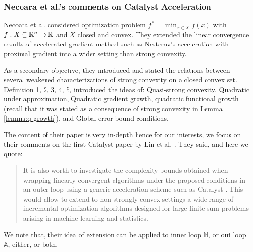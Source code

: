 \documentclass[12pt]{article}
\begin{document}
        \subsubsection{Necoara et al.'s comments on Catalyst Acceleration}
            Necoara et al. \cite{necoara_linear_2019} considered optimization problem $f^* = \min_{x \in X} f(x)$ with $f: X \subseteq \mathbb R^n \rightarrow \mathbb R$ and $X$ closed and convex. 
            They extended the linear convergence results of accelerated gradient method such as Nesterov's acceleration with proximal gradient into a wider setting than strong convexity. 
            \par
            As a secondary objective, they introduced and stated the relations between several weakened characterizations of strong convexity on a closed convex set. 
            Definition 1, 2, 3, 4, 5, introduced the ideas of: Quasi-strong convexity, Quadratic under approximation, Quadratic gradient growth, quadratic functional growth (recall that it was stated as a consequence of strong convexity in Lemma \ref{lemma:q-growth}), and Global error bound conditions. 
            \par
            The content of their paper is very in-depth hence for our interests, we focus on their comments on the first Catalyst paper by Lin et al. \cite{lin_universal_2015}. 
            They said, and here we quote: 
            \begin{quote}
                It is also worth to investigate the complexity bounds obtained when wrapping linearly-convergent algorithms under the proposed conditions in an outer-loop using a generic acceleration scheme such as Catalyst \cite{lin_universal_2015}. This would allow to extend to non-strongly convex settings a wide range of incremental optimization algorithms designed for large finite-sum problems arising in machine learning and statistics.
            \end{quote}
            We note that, their idea of extension can be applied to inner loop $\mathbb M$, or out loop $\mathbb A$, either, or both. 
\end{document}
